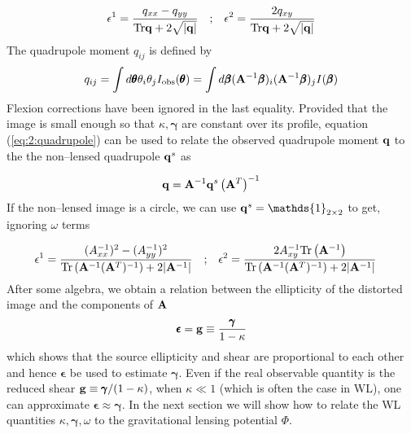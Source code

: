 \begin{equation}
\label{eq:2:ellipticity-1}
\begin{matrix}
\displaystyle \epsilon^1 = \frac{q_{xx}-q_{yy}}{{\rm Tr}\mathbf{q}+2\sqrt{\vert\mathbf{q}\vert}} & ; & \displaystyle \epsilon^2 = \frac{2q_{xy}}{{\rm Tr}\mathbf{q}+2\sqrt{\vert\mathbf{q}\vert}}
\end{matrix}
\end{equation} 
%
The quadrupole moment $q_{ij}$ is defined by 
\begin{equation}
\label{eq:2:quadrupole}
q_{ij} = \int d\pmb{\theta} \theta_i\theta_j I_{\rm obs}(\pmb{\theta}) = \int d\pmb{\beta} (\mathbf{A}^{-1}\pmb{\beta})_i(\mathbf{A}^{-1}\pmb{\beta})_j I(\pmb{\beta})
\end{equation}
%
Flexion corrections have been ignored in the last equality. Provided that the image is small enough so that $\kappa,\pmb{\gamma}$ are constant over its profile, equation (\ref{eq:2:quadrupole}) can be used to relate the observed quadrupole moment $\mathbf{q}$ to the the non--lensed quadrupole $\mathbf{q}^s$ as  

\begin{equation}
\label{ref:4:quadrupole-1}
\mathbf{q} = \mathbf{A}^{-1}\mathbf{q}^s\left(\mathbf{A}^T\right)^{-1}
\end{equation}
%
If the non--lensed image is a circle, we can use $\bb{q}^s=\mathds{1}_{2\times 2}$ to get, ignoring $\omega$ terms 

\begin{equation}
\label{eq:2:ellipticity-2}
\begin{matrix}
\displaystyle \epsilon^1 = \frac{(A^{-1}_{xx})^2-(A^{-1}_{yy})^2}{{\rm Tr}\left(\mathbf{A}^{-1}(\mathbf{A}^T)^{-1}\right)+2\vert\mathbf{A}^{-1}\vert} & ; & \displaystyle \epsilon^2 = \frac{2A^{-1}_{xy}{\rm Tr}\left(\mathbf{A}^{-1}\right)}{{\rm Tr}\left(\mathbf{A}^{-1}(\mathbf{A}^T)^{-1}\right)+2\vert\mathbf{A}^{-1}\vert} &
\end{matrix}
\end{equation}
%
After some algebra, we obtain a relation between the ellipticity of the distorted image and the components of $\mathbf{A}$
\begin{equation}
\label{eq:2:ellipticity-3}
\pmb{\epsilon} = \mathbf{g} \equiv \frac{\pmb{\gamma}}{1-\kappa}
\end{equation}
%
which shows that the source ellipticity and shear are proportional to each other and hence $\pmb{\epsilon}$ be used to estimate $\pmb{\gamma}$. Even if the real observable quantity is the reduced shear $\mathbf{g}\equiv \pmb{\gamma}/(1-\kappa)$, when $\kappa\ll 1$ (which is often the case in WL), one can approximate $\pmb{\epsilon}\approx \pmb{\gamma}$. In the next section we will show how to relate the WL quantities $\kappa,\pmb{\gamma},\omega$ to the gravitational lensing potential $\Phi$. 

